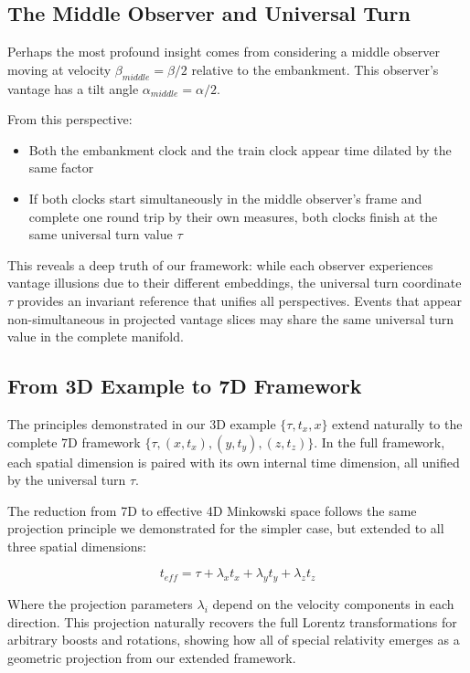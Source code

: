 \documentclass{article}
\begin{document}
\subsection{The Middle Observer and Universal Turn}

Perhaps the most profound insight comes from considering a middle observer moving at velocity $\beta_{middle} = \beta/2$ relative to the embankment. This observer's vantage has a tilt angle $\alpha_{middle} = \alpha/2$.

From this perspective:
\begin{itemize}
\item Both the embankment clock and the train clock appear time dilated by the same factor
\item If both clocks start simultaneously in the middle observer's frame and complete one round trip by their own measures, both clocks finish at the same universal turn value $\tau$
\end{itemize}

This reveals a deep truth of our framework: while each observer experiences vantage illusions due to their different embeddings, the universal turn coordinate $\tau$ provides an invariant reference that unifies all perspectives. Events that appear non-simultaneous in projected vantage slices may share the same universal turn value in the complete manifold.

\subsection{From 3D Example to 7D Framework}

The principles demonstrated in our 3D example $\{\tau, t_x, x\}$ extend naturally to the complete 7D framework $\{\tau, (x, t_x), (y, t_y), (z, t_z)\}$. In the full framework, each spatial dimension is paired with its own internal time dimension, all unified by the universal turn $\tau$.

The reduction from 7D to effective 4D Minkowski space follows the same projection principle we demonstrated for the simpler case, but extended to all three spatial dimensions:

\begin{equation}
t_{eff} = \tau + \lambda_x t_x + \lambda_y t_y + \lambda_z t_z
\end{equation}

Where the projection parameters $\lambda_i$ depend on the velocity components in each direction. This projection naturally recovers the full Lorentz transformations for arbitrary boosts and rotations, showing how all of special relativity emerges as a geometric projection from our extended framework.
\end{document}
